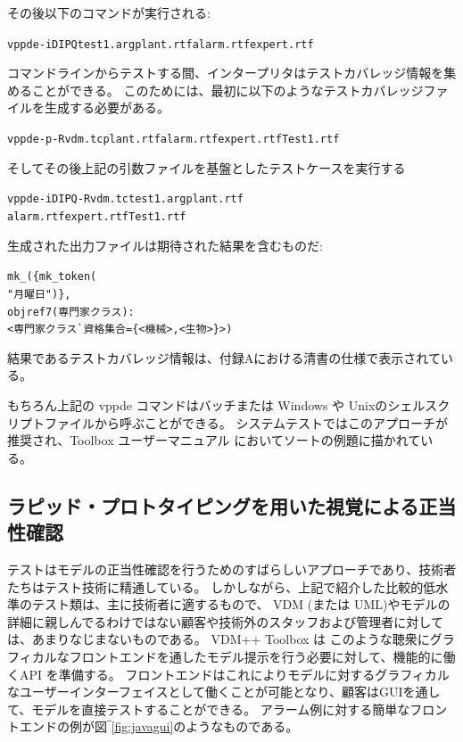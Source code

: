 \documentclass[\pformat,12pt,twoside]{jarticle}
\begin{document}
その後以下のコマンドが実行される: 

\small
\begin{alltt}
  vppde -iDIPQ test1.arg plant.rtf alarm.rtf expert.rtf
\end{alltt}
\normalsize

コマンドラインからテストする間、インタープリタはテストカバレッジ情報を集めることができる。
このためには、最初に以下のようなテストカバレッジファイルを生成する必要がある。

\small
\begin{alltt}
  vppde -p -R vdm.tc plant.rtf alarm.rtf expert.rtf Test1.rtf
\end{alltt}
\normalsize

そしてその後上記の引数ファイルを基盤としたテストケースを実行する

\small
\begin{alltt}
  vppde -iDIPQ -R vdm.tc test1.arg plant.rtf
                                   alarm.rtf expert.rtf Test1.rtf
\end{alltt}
\normalsize

生成された出力ファイルは期待された結果を含むものだ:

\small
\begin{alltt}
  mk\_( \{ mk\_token( 
   "月曜日" ) \},
   objref7(専門家クラス):
   \texttt{<} 専門家クラス\`{}資格集合 = \{ \texttt{<}機械\texttt{>},\texttt{<}生物\texttt{>} \} \texttt{>} )

\end{alltt}
\normalsize

結果であるテストカバレッジ情報は、付録Aにおける清書の仕様で表示されている。

もちろん上記の vppde コマンドはバッチまたは Windows や Unixのシェルスクリプトファイルから呼ぶことができる。
システムテストではこのアプローチが推奨され、Toolbox ユーザーマニュアル \cite{UserManPP-CSK}においてソートの例題に描かれている。

\subsection{ラピッド・プロトタイピングを用いた視覚による正当性確認}

テストはモデルの正当性確認を行うためのすばらしいアプローチであり、技術者たちはテスト技術に精通している。
しかしながら、上記で紹介した比較的低水準のテスト類は、主に技術者に適するもので、 VDM (または UML)やモデルの詳細に親しんでるわけではない顧客や技術外のスタッフおよび管理者に対しては、あまりなじまないものである。
 VDM++ Toolbox は このような聴衆にグラフィカルなフロントエンドを通したモデル提示を行う必要に対して、機能的に働くAPI を準備する。
フロントエンドはこれによりモデルに対するグラフィカルなユーザーインターフェイスとして働くことが可能となり、顧客はGUIを通して、モデルを直接テストすることができる。
アラーム例に対する簡単なフロントエンドの例が図‾\ref{fig:javagui}のようなものである。
\end{document}
